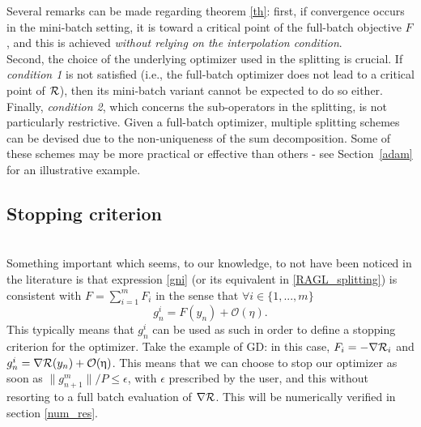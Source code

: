 \documentclass[article,authoryear,jmlmc]{beg_32}             %
\begin{document}
Several remarks can be made regarding theorem \ref{th}:
first, if convergence occurs in the mini-batch setting, it is toward a critical point of the full-batch objective $F$, and this is achieved {\em without relying on the
interpolation condition}.\\
Second, the choice of the underlying optimizer used in the splitting is crucial. If {\em condition 1} is not satisfied (i.e., the full-batch optimizer does not lead to a critical
point of $\mathcal{R}$), then its mini-batch variant cannot be expected to do so either.\\
Finally, {\em condition 2}, which concerns the sub-operators in the splitting, is not particularly restrictive. Given a full-batch optimizer, multiple splitting schemes can be devised due to the non-uniqueness of the sum decomposition. Some of these schemes may be more practical or effective than others - see Section~\ref{adam} for an illustrative example.

\subsection{Stopping criterion}
~~\\
Something important which seems, to our knowledge, to not have been noticed in the literature is that 
  expression \eqref{gni} (or its equivalent in \eqref{RAGL_splitting}) is consistent with $F=\sum_{i=1}^m F_i$ in the sense that $\forall i\in\{1,...,m\}$ 
  \begin{equation}
    \label{stopping_criterion}
    g_n^i = F(y_n) +\mathcal{O}(\eta). 
  \end{equation}
  This typically means that $g_n^i$ can be used as such in order to define a stopping criterion for the optimizer.
  Take the example of GD: in this case, $F_i=-\nabla \mathcal{R}_i$ and $g_n^i = \nabla \mathcal{R}(y_n)+\mathcal{O}(\upeta)$. This means that we can choose to stop our optimizer as soon as $\|g_{n+1}^m\|/P \leq
  \epsilon$, with $\epsilon$ prescribed by the user, and this without resorting to a full batch evaluation of $\nabla \mathcal{R}$. This will be numerically verified in section \ref{num_res}. \\
\ \\
\end{document}
